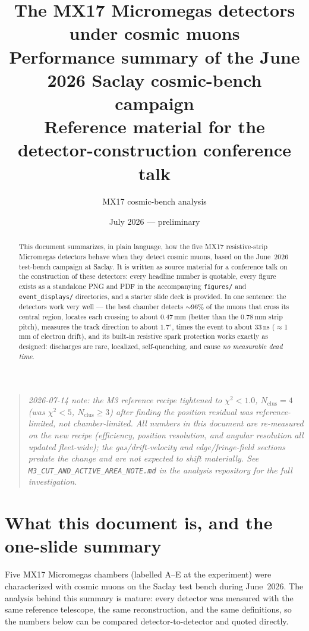 \documentclass[11pt]{article}
\title{\vspace{-1.5em}The MX17 Micromegas detectors under cosmic muons\\
\large Performance summary of the June 2026 Saclay cosmic-bench campaign\\
\normalsize Reference material for the detector-construction conference talk}
\author{MX17 cosmic-bench analysis}
\date{July 2026 --- preliminary}
\begin{document}
\maketitle
\vspace{-1.5em}

\begin{quote}\small\itshape
2026-07-14 note: the M3 reference recipe tightened to $\chi^2<1.0$,
$N_\mathrm{clus}=4$ (was $\chi^2<5$, $N_\mathrm{clus}\ge3$) after finding the
position residual was reference-limited, not chamber-limited. All numbers in
this document are re-measured on the new recipe (efficiency, position
resolution, and angular resolution all updated fleet-wide); the gas/drift-velocity
and edge/fringe-field sections predate the change and are not expected to shift
materially. See \texttt{M3\_CUT\_AND\_ACTIVE\_AREA\_NOTE.md} in the analysis
repository for the full investigation.
\end{quote}

\begin{abstract}
\noindent This document summarizes, in plain language, how the five MX17
resistive-strip Micromegas detectors behave when they detect cosmic muons, based
on the June~2026 test-bench campaign at Saclay. It is written as source material
for a conference talk on the construction of these detectors: every headline
number is quotable, every figure exists as a standalone PNG and PDF in the
accompanying \texttt{figures/} and \texttt{event\_displays/} directories, and a
starter slide deck is provided. In one sentence: the detectors work very well ---
the best chamber detects \(\sim\)96\% of the muons that cross its central region,
locates each crossing to about $0.47\,$mm (better than the $0.78\,$mm strip
pitch), measures the track direction to about $1.7^\circ$, times the event to
about 33\,ns ($\approx$1\,mm of electron drift), and its built-in resistive
spark protection works exactly as designed: discharges are rare, localized,
self-quenching, and cause \emph{no measurable dead time}.
\end{abstract}

\tableofcontents
\newpage

\section{What this document is, and the one-slide summary}

Five MX17 Micromegas chambers (labelled A--E at the experiment) were
characterized with cosmic muons on the Saclay test bench during June~2026.
The analysis behind this summary is mature: every detector was measured with
the same reference telescope, the same reconstruction, and the same definitions,
so the numbers below can be compared detector-to-detector and quoted directly.
\end{document}
